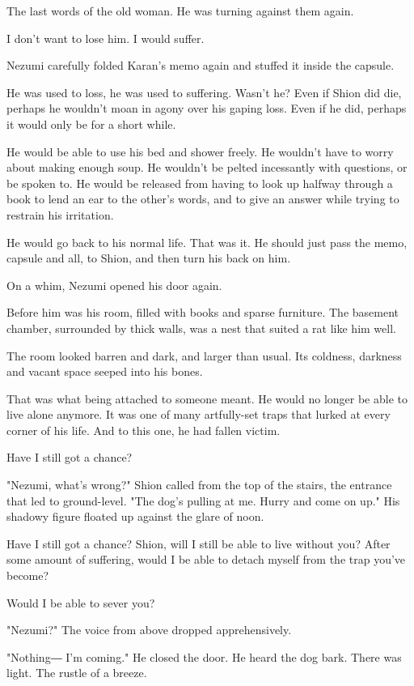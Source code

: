The last words of the old woman. He was turning against them again.

I don't want to lose him. I would suffer.

Nezumi carefully folded Karan's memo again and stuffed it inside the
capsule.

He was used to loss, he was used to suffering. Wasn't he? Even if Shion
did die, perhaps he wouldn't moan in agony over his gaping loss. Even if
he did, perhaps it would only be for a short while.

He would be able to use his bed and shower freely. He wouldn't have to
worry about making enough soup. He wouldn't be pelted incessantly with
questions, or be spoken to. He would be released from having to look up
halfway through a book to lend an ear to the other's words, and to give
an answer while trying to restrain his irritation.

He would go back to his normal life. That was it. He should just pass
the memo, capsule and all, to Shion, and then turn his back on him.

On a whim, Nezumi opened his door again.

Before him was his room, filled with books and sparse furniture. The
basement chamber, surrounded by thick walls, was a nest that suited a
rat like him well.

The room looked barren and dark, and larger than usual. Its coldness,
darkness and vacant space seeped into his bones.

That was what being attached to someone meant. He would no longer be
able to live alone anymore. It was one of many artfully-set traps that
lurked at every corner of his life. And to this one, he had fallen
victim.

Have I still got a chance?

"Nezumi, what's wrong?" Shion called from the top of the stairs, the
entrance that led to ground-level. "The dog's pulling at me. Hurry and
come on up." His shadowy figure floated up against the glare of noon.

Have I still got a chance? Shion, will I still be able to live without
you? After some amount of suffering, would I be able to detach myself
from the trap you've become?

Would I be able to sever you?

"Nezumi?" The voice from above dropped apprehensively.

"Nothing― I'm coming." He closed the door. He heard the dog bark. There
was light. The rustle of a breeze.

